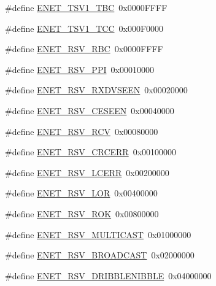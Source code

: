 \begin{DoxyCompactItemize}
\item 
\#define \hyperlink{group__ENET__17XX__40XX_ga85659c24bcb857d841bc18e037ee3a78}{E\-N\-E\-T\-\_\-\-T\-S\-V1\-\_\-\-T\-B\-C}~0x0000\-F\-F\-F\-F
\item 
\#define \hyperlink{group__ENET__17XX__40XX_ga9a2d8f8be313560a8d1858f623d5d599}{E\-N\-E\-T\-\_\-\-T\-S\-V1\-\_\-\-T\-C\-C}~0x000\-F0000
\item 
\#define \hyperlink{group__ENET__17XX__40XX_gabebe49780c8611118ce1596cf3d77436}{E\-N\-E\-T\-\_\-\-R\-S\-V\-\_\-\-R\-B\-C}~0x0000\-F\-F\-F\-F
\item 
\#define \hyperlink{group__ENET__17XX__40XX_gaa45464496eefb8f66d8281ceefe3b198}{E\-N\-E\-T\-\_\-\-R\-S\-V\-\_\-\-P\-P\-I}~0x00010000
\item 
\#define \hyperlink{group__ENET__17XX__40XX_ga96fe41c39224b433c1fe074b76161ec7}{E\-N\-E\-T\-\_\-\-R\-S\-V\-\_\-\-R\-X\-D\-V\-S\-E\-E\-N}~0x00020000
\item 
\#define \hyperlink{group__ENET__17XX__40XX_ga32813050731261f0abb8a938a49db29d}{E\-N\-E\-T\-\_\-\-R\-S\-V\-\_\-\-C\-E\-S\-E\-E\-N}~0x00040000
\item 
\#define \hyperlink{group__ENET__17XX__40XX_gac21ffe7a15a96229eb770a7f1dcdb7dd}{E\-N\-E\-T\-\_\-\-R\-S\-V\-\_\-\-R\-C\-V}~0x00080000
\item 
\#define \hyperlink{group__ENET__17XX__40XX_ga7481775906d508f6a529b46520e58a97}{E\-N\-E\-T\-\_\-\-R\-S\-V\-\_\-\-C\-R\-C\-E\-R\-R}~0x00100000
\item 
\#define \hyperlink{group__ENET__17XX__40XX_gafadac62e2e18ad75a244e4227509931d}{E\-N\-E\-T\-\_\-\-R\-S\-V\-\_\-\-L\-C\-E\-R\-R}~0x00200000
\item 
\#define \hyperlink{group__ENET__17XX__40XX_gaae8c1aa30582b7a66657c78b54bcf43a}{E\-N\-E\-T\-\_\-\-R\-S\-V\-\_\-\-L\-O\-R}~0x00400000
\item 
\#define \hyperlink{group__ENET__17XX__40XX_ga32032cd510a057a50e4e08acf50ddcde}{E\-N\-E\-T\-\_\-\-R\-S\-V\-\_\-\-R\-O\-K}~0x00800000
\item 
\#define \hyperlink{group__ENET__17XX__40XX_gaf0bd8c3446555f296b06d4865c8cb6cd}{E\-N\-E\-T\-\_\-\-R\-S\-V\-\_\-\-M\-U\-L\-T\-I\-C\-A\-S\-T}~0x01000000
\item 
\#define \hyperlink{group__ENET__17XX__40XX_ga87f8e1929545347ff2ddd8ee658ef54b}{E\-N\-E\-T\-\_\-\-R\-S\-V\-\_\-\-B\-R\-O\-A\-D\-C\-A\-S\-T}~0x02000000
\item 
\#define \hyperlink{group__ENET__17XX__40XX_ga5c2ebce59acc2a9ca4e4569bcc6290ca}{E\-N\-E\-T\-\_\-\-R\-S\-V\-\_\-\-D\-R\-I\-B\-B\-L\-E\-N\-I\-B\-B\-L\-E}~0x04000000

\end{DoxyCompactItemize}
